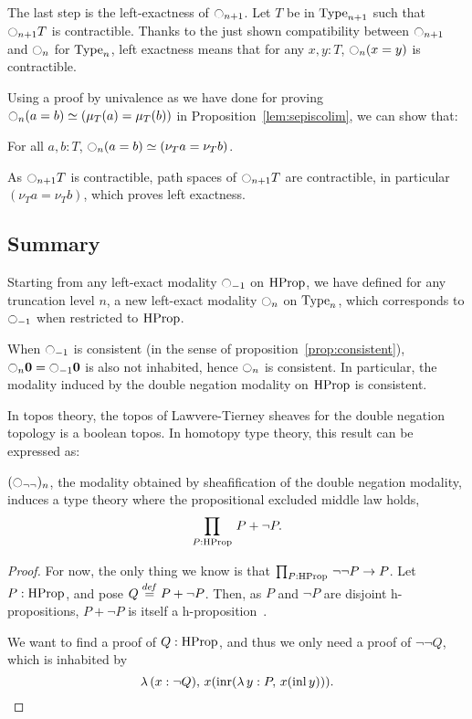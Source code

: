 The last step is the left-exactness of $\ocircle_{n+1}$. Let $T$ be in
$\operatorname{Type}_{n+1}$ such that $\ocircle_{n+1} T$ is contractible.  Thanks to the just
shown compatibility between $\ocircle_{n+1}$ and $\ocircle_n$ for
$\operatorname{Type}_n$, left exactness means that for any $x,y: T$,
$\ocircle_n(x=y)$ is contractible.

Using a proof by univalence as we have done for proving $\ocircle_n (a=b) \simeq (\mu_T(a) =
\mu_T (b))$ in Proposition~\ref{lem:sepiscolim}, we can show that:
\begin{prop}
  For all $a,b:T$, $\ocircle_n(a=b) \simeq (\nu_T a = \nu_T b)$.
\end{prop}

As $\ocircle_{n+1} T$ is contractible, path spaces of $\ocircle_{n+1} T$ are
contractible, in particular $(\nu_T a=\nu_T b)$, which proves left
exactness.

\subsection{Summary}
\label{ssec:summary}

Starting from any left-exact modality $\ocircle_{-1}$ on $\operatorname{HProp}$, we
have defined for any truncation level $n$, a new left-exact modality
$\ocircle_n$ on $\operatorname{Type}_n$, which corresponds to $\ocircle_{-1}$ when
restricted to $\operatorname{HProp}$.


When $\ocircle_{-1}$ is consistent (in the sense of
proposition~\ref{prop:consistent}), 
$\ocircle_{n}\mathbf{0}=\ocircle_{-1}\mathbf{0}$ is also not inhabited, hence
$\ocircle_n$ is consistent. 
%
In particular, the modality induced by the double negation modality on
$\operatorname{HProp}$ is consistent.

In topos theory, the topos of Lawvere-Tierney sheaves for the double
negation topology is a boolean topos. In homotopy type theory, this
result can be expressed as:

\begin{prop}
  $(\ocircle_{\lnot\lnot})_n$, the modality obtained by sheafification
  of the double negation modality,
  induces a type theory where the propositional excluded middle law
  holds, \ie{}
  \[
    \prod_{P:\operatorname{HProp}}\, P + \lnot P.
  \]
\end{prop}
\begin{proof}
  For now, the only thing we know is that $\prod_{P:\operatorname{HProp}}\, \lnot\lnot
    P \to P$. Let $P:\operatorname{HProp}$, and pose $Q \overset{de\hspace{-0.2ex}f}{=} P + \lnot P$. Then, as
  $P$ and $\lnot P$ are disjoint h-propositions, $P + \lnot P$ is
  itself a h-proposition~\cite[\texttt{ishprop\_sum}]{hottlib}.

  We want to find a proof of $Q:\operatorname{HProp}$, and thus we only need a proof
  of $\lnot\lnot Q$, which is inhabited by
  \[
    \lambda\, (x:\lnot Q),\, x(\operatorname{inr} (\lambda\, y:P,\, x(\operatorname{inl} y))).
  \]
\end{proof}


